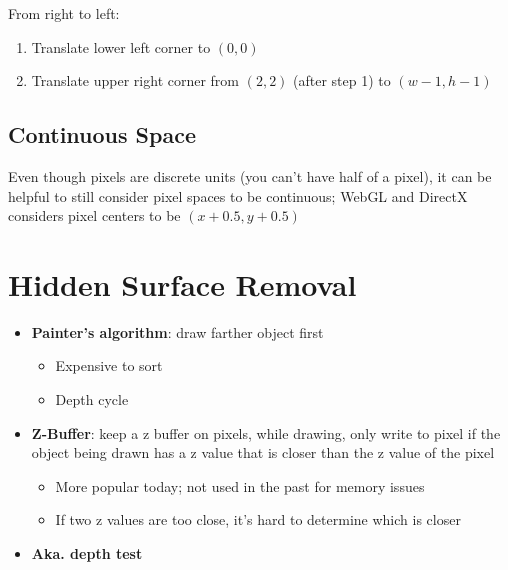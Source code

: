   From right to left:

  \begin{enumerate}
    \item Translate lower left corner to $ \left( 0, 0 \right) $
    \item Translate upper right corner from $ \left( 2, 2 \right) $ (after step
    1) to $ \left( w - 1, h - 1 \right) $
  \end{enumerate}

  \subsection{Continuous Space}

    Even though pixels are discrete units (you can't have half of a pixel),
    it can be helpful to still consider pixel spaces to be continuous; WebGL
    and DirectX considers pixel centers to be
    $ \left( x + 0.5, y + 0.5 \right) $

\section{Hidden Surface Removal}

  \begin{itemize}
    \item \textbf{Painter's algorithm}: draw farther object first
    \begin{itemize}
      \item Expensive to sort
      \item Depth cycle
    \end{itemize}

    \item \textbf{Z-Buffer}: keep a z buffer on pixels, while drawing,
    only write to pixel if the object being drawn has a z value that is
    closer than the z value of the pixel
    \begin{itemize}
      \item More popular today; not used in the past for memory issues
      \item If two z values are too close, it's hard to determine which is
      closer
    \end{itemize}

    \item \textbf{Aka. depth test}
  \end{itemize}
